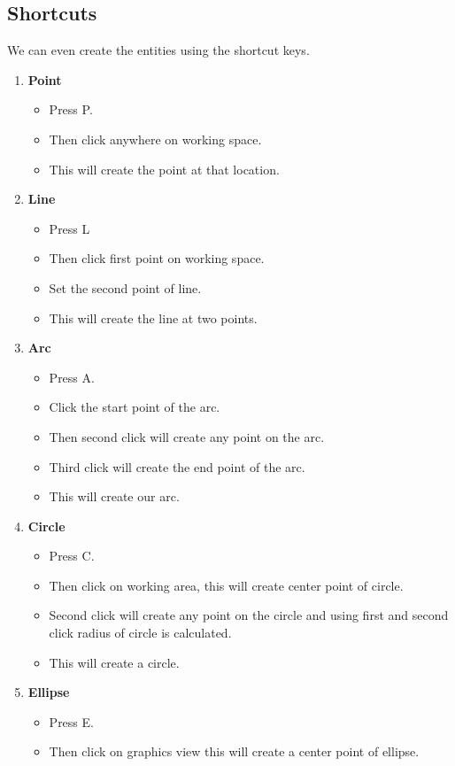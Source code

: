 \subsection{Shortcuts}
We can even create the entities using the shortcut keys.
\begin{enumerate}
\item \textbf{Point}
\begin{itemize}
\item Press P.
\item Then click anywhere on working space.
\item This will create the point at that location.
\end{itemize}
\item \textbf{Line}
\begin{itemize}
\item Press L
\item Then click first point on working space.
\item Set the second point of line.
\item This will create the line at two points.
\end{itemize}
\item \textbf{Arc}
\begin{itemize}
\item Press A.
\item Click the start point of the arc.
\item Then second click will create any point on the arc.
\item Third click will create the end point of the arc.
\item This will create our arc.
\end{itemize}
\item \textbf{Circle}
\begin{itemize}
\item Press C.
\item Then click on working area, this will create center point of circle.
\item Second click will create any point on the circle and using first and second click radius of circle is calculated.
\item This will create a circle.
\end{itemize}
\item \textbf{Ellipse}
\begin{itemize}
\item Press E.
\item Then click on graphics view this will create a center point of ellipse.

\end{itemize}
\end{enumerate}
